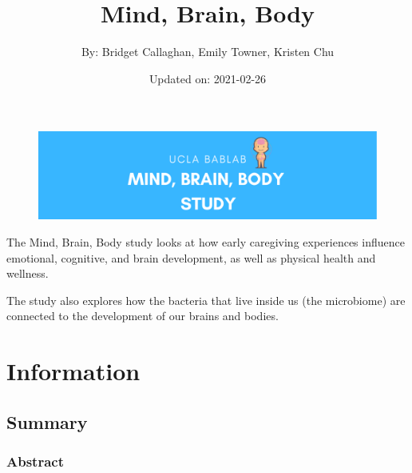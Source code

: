 \documentclass[]{book}
\title{Mind, Brain, Body}
\author{By: Bridget Callaghan, Emily Towner, Kristen Chu}
\date{Updated on: 2021-02-26}
\begin{document}
\maketitle

{
\setcounter{tocdepth}{1}
\tableofcontents
}
\hypertarget{section}{%
\chapter{}\label{section}}

\begin{figure}
\centering
\includegraphics{images/index/banner.png}
\caption{}
\end{figure}

The Mind, Brain, Body study looks at how early caregiving experiences influence emotional, cognitive, and brain development, as well as physical health and wellness.

The study also explores how the bacteria that live inside us (the microbiome) are connected to the development of our brains and bodies.

\hypertarget{information}{%
\chapter{Information}\label{information}}

\hypertarget{summary}{%
\section{Summary}\label{summary}}

\hypertarget{abstract}{%
\subsection{Abstract}\label{abstract}}
\end{document}
